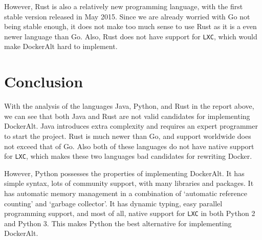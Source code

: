 \documentclass[letterpaper,twocolumn,10pt]{article}
\begin{document}
However, Rust is also a relatively new programming language, with the first stable version released in May 2015. Since we are already worried with Go not being stable enough, it does not make too much sense to use Rust as it is a even newer language than Go. Also, Rust does not have support for {\tt LXC}, which would make DockerAlt hard to implement.

\section{Conclusion}

With the analysis of the languages Java, Python, and Rust in the report above, we can see that both Java and Rust are not valid candidates for implementing DockerAlt. Java introduces extra complexity and requires an expert programmer to start the project. Rust is much newer than Go, and support worldwide does not exceed that of Go. Also both of these languages do not have native support for {\tt LXC}, which makes these two languages bad candidates for rewriting Docker.

However, Python possesses the properties of implementing DockerAlt. It has simple syntax, lots of community support, with many libraries and packages. It has automatic memory management in a combination of `automatic reference counting' and `garbage collector'. It has dynamic typing, easy parallel programming support, and most of all, native support for {\tt LXC} in both Python 2 and Python 3. This makes Python the best alternative for implementing DockerAlt.
\end{document}
